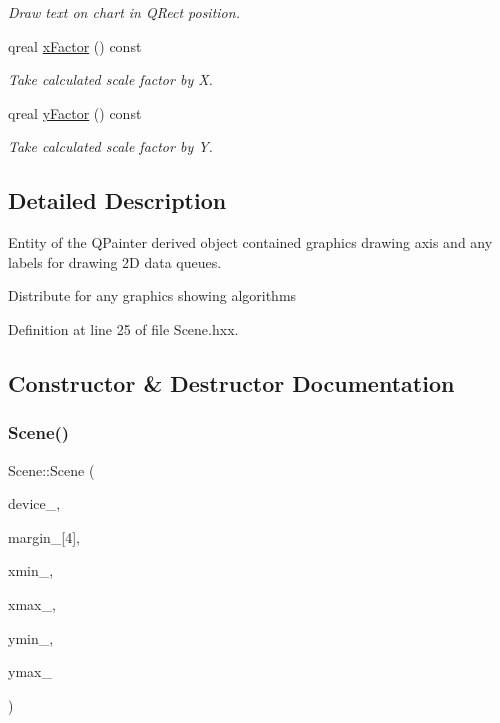 \begin{DoxyCompactItemize}
\begin{DoxyCompactList}\small\item\em Draw text on chart in Q\+Rect position. \end{DoxyCompactList}\item 
\mbox{\label{classeven_1_1_scene_a0f695bad8950131b8f537f0bb11b17d9}} 
qreal \mbox{\hyperlink{classeven_1_1_scene_a0f695bad8950131b8f537f0bb11b17d9}{x\+Factor}} () const
\begin{DoxyCompactList}\small\item\em Take calculated scale factor by X. \end{DoxyCompactList}\item 
\mbox{\label{classeven_1_1_scene_afeac9b5486be73efa30dc124865d674b}} 
qreal \mbox{\hyperlink{classeven_1_1_scene_afeac9b5486be73efa30dc124865d674b}{y\+Factor}} () const
\begin{DoxyCompactList}\small\item\em Take calculated scale factor by Y. \end{DoxyCompactList}\end{DoxyCompactItemize}


\subsection{Detailed Description}
Entity of the Q\+Painter derived object contained graphics drawing axis and any labels for drawing 2D data queues. 

Distribute for any graphics showing algorithms 

Definition at line 25 of file Scene.\+hxx.



\subsection{Constructor \& Destructor Documentation}
\mbox{\label{classeven_1_1_scene_af610df9d9f7ea262950e1e2184874153}} 
\subsubsection{\texorpdfstring{Scene()}{Scene()}}
{\footnotesize\ttfamily Scene\+::\+Scene (\begin{DoxyParamCaption}\item[{Q\+Paint\+Device $\ast$}]{device\+\_\+,  }\item[{qreal}]{margin\+\_\+\mbox{[}4\mbox{]},  }\item[{qreal}]{xmin\+\_\+,  }\item[{qreal}]{xmax\+\_\+,  }\item[{qreal}]{ymin\+\_\+,  }\item[{qreal}]{ymax\+\_\+ }\end{DoxyParamCaption})}



